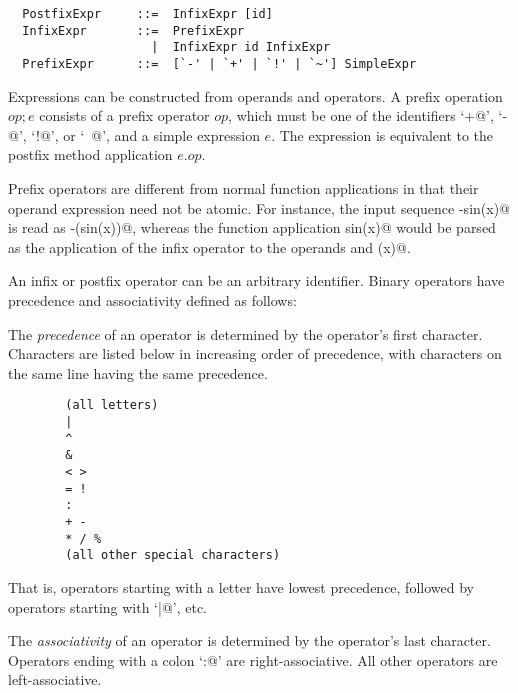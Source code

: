 \documentclass[a4paper,12pt,twoside,titlepage]{book}
\begin{document}
\syntax\begin{lstlisting}
  PostfixExpr     ::=  InfixExpr [id]
  InfixExpr       ::=  PrefixExpr
                    |  InfixExpr id InfixExpr
  PrefixExpr      ::=  [`-' | `+' | `!' | `~'] SimpleExpr 
\end{lstlisting}

Expressions can be constructed from operands and operators.  A prefix
operation $op;e$ consists of a prefix operator $op$, which
must be one of the identifiers `\lstinline@+@', `\lstinline@-@', `\lstinline@!@', or
`\lstinline@~@', and a simple expression $e$.  The expression is
equivalent to the postfix method application $e.op$.

Prefix operators are different from normal function applications in
that their operand expression need not be atomic. For instance, the
input sequence \lstinline@-sin(x)@ is read as \lstinline@-(sin(x))@, whereas the
function application \lstinline@negate sin(x)@ would be parsed as the
application of the infix operator  to the operands
 and \lstinline@(x)@.

An infix or postfix operator can be an arbitrary identifier. Binary
operators have precedence and associativity defined as follows:

The {\em precedence} of an operator is determined by the operator's first
character. Characters are listed below in increasing order of
precedence, with characters on the same line having the same precedence.
\begin{lstlisting}
        (all letters)
        |
        ^
        &
        < >
        = !
        :
        + -
        * / %
        (all other special characters)
\end{lstlisting}
That is, operators starting with a letter have lowest precedence,
followed by operators starting with `\lstinline@|@', etc.

The {\em associativity} of an operator is determined by the operator's
last character.  Operators ending with a colon `\lstinline@:@' are
right-associative. All other operators are left-associative.
\end{document}
